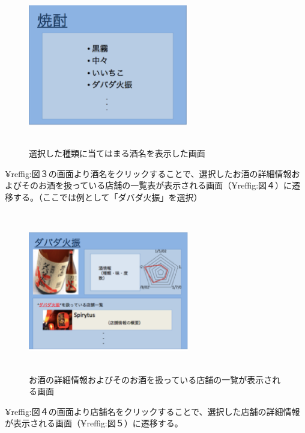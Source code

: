 \documentclass[a4j,titlepage]{jarticle}
\begin{document}
\begin {figure}[!htbp]
    \begin{center}
    \includegraphics [height=7cm, width=7cm]{3.eps}
      \caption {選択した種類に当てはまる酒名を表示した画面}
    \label {fig:3}
    \end{center}
\end {figure}
¥ref{fig:図３}の画面より酒名をクリックすることで、選択したお酒の詳細情報およびそのお酒を扱っている店舗の一覧表が表示される画面（¥ref{fig:図４}）に遷移する。（ここでは例として「ダバダ火振」を選択）
\clearpage
\begin {figure}[!htbp]
    \begin{center}
    \includegraphics [height=7cm, width=7cm]{4.eps}
    \caption {お酒の詳細情報およびそのお酒を扱っている店舗の一覧が表示される画面}
    \label {fig:4}
    \end{center}
\end {figure}



¥ref{fig:図４}の画面より店舗名をクリックすることで、選択した店舗の詳細情報が表示される画面（¥ref{fig:図５}）に遷移する。
\end{document}

